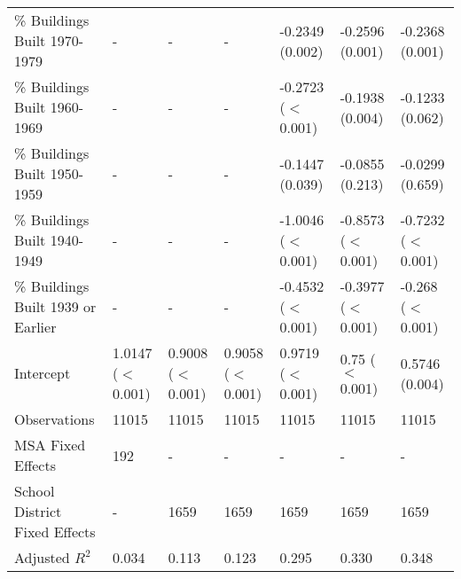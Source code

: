 \begin{landscape}
\begin{table}[h]
\begin{tabular}{l|llllll}
\% Buildings Built 1970-1979 &- & - & - & -0.2349 (0.002) & -0.2596 (0.001) & -0.2368 (0.001) \\
\% Buildings Built 1960-1969 &- & - & - & -0.2723 ($<$0.001) & -0.1938 (0.004) & -0.1233 (0.062) \\
\% Buildings Built 1950-1959 &- & - & - & -0.1447 (0.039) & -0.0855 (0.213) & -0.0299 (0.659) \\
\% Buildings Built 1940-1949 &- & - & - & -1.0046 ($<$0.001) & -0.8573 ($<$0.001) & -0.7232 ($<$0.001) \\
\% Buildings Built 1939 or Earlier &- & - & - & -0.4532 ($<$0.001) & -0.3977 ($<$0.001) & -0.268 ($<$0.001) \\
Intercept &1.0147 ($<$0.001) & 0.9008 ($<$0.001) & 0.9058 ($<$0.001) & 0.9719 ($<$0.001) & 0.75 ($<$0.001) & 0.5746 (0.004) \\
Observations &11015 & 11015 & 11015 & 11015 & 11015 & 11015 \\
MSA Fixed Effects &192 & - & - & - & - & - \\
School District Fixed Effects &- & 1659 & 1659 & 1659 & 1659 & 1659 \\
Adjusted $R^2$ &0.034 & 0.113 & 0.123 & 0.295 & 0.330 & 0.348 \\\hline
\end{tabular}
\end{table}
\newpage
\end{landscape}
\restoregeometry

